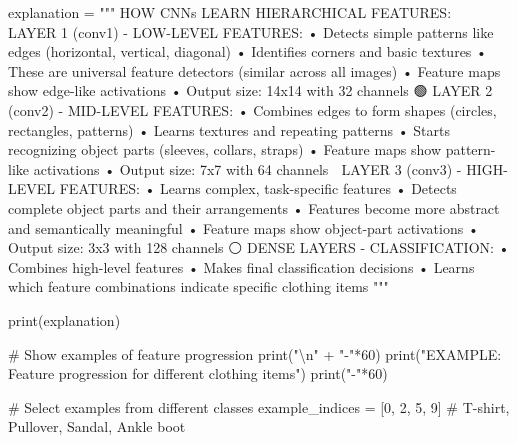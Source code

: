\documentclass[
  letterpaper,
  DIV=11,
  numbers=noendperiod]{scrreprt}
\newenvironment{Shaded}{\begin{snugshade}}{\end{snugshade}}
\newcommand{\BuiltInTok}[1]{\textcolor[rgb]{0.00,0.23,0.31}{#1}}
\newcommand{\CharTok}[1]{\textcolor[rgb]{0.13,0.47,0.30}{#1}}
\newcommand{\CommentTok}[1]{\textcolor[rgb]{0.37,0.37,0.37}{#1}}
\newcommand{\DecValTok}[1]{\textcolor[rgb]{0.68,0.00,0.00}{#1}}
\newcommand{\NormalTok}[1]{\textcolor[rgb]{0.00,0.23,0.31}{#1}}
\newcommand{\OperatorTok}[1]{\textcolor[rgb]{0.37,0.37,0.37}{#1}}
\newcommand{\StringTok}[1]{\textcolor[rgb]{0.13,0.47,0.30}{#1}}
\begin{document}
\begin{Shaded}
\begin{Highlighting}[]
\NormalTok{    explanation }\OperatorTok{=} \StringTok{"""}
\StringTok{    HOW CNNs LEARN HIERARCHICAL FEATURES:}
\StringTok{    }
\StringTok{    🔵 LAYER 1 (conv1) {-} LOW{-}LEVEL FEATURES:}
\StringTok{       • Detects simple patterns like edges (horizontal, vertical, diagonal)}
\StringTok{       • Identifies corners and basic textures}
\StringTok{       • These are universal feature detectors (similar across all images)}
\StringTok{       • Feature maps show edge{-}like activations}
\StringTok{       • Output size: 14x14 with 32 channels}
\StringTok{    }
\StringTok{    🟢 LAYER 2 (conv2) {-} MID{-}LEVEL FEATURES:}
\StringTok{       • Combines edges to form shapes (circles, rectangles, patterns)}
\StringTok{       • Learns textures and repeating patterns}
\StringTok{       • Starts recognizing object parts (sleeves, collars, straps)}
\StringTok{       • Feature maps show pattern{-}like activations}
\StringTok{       • Output size: 7x7 with 64 channels}
\StringTok{    }
\StringTok{    🔴 LAYER 3 (conv3) {-} HIGH{-}LEVEL FEATURES:}
\StringTok{       • Learns complex, task{-}specific features}
\StringTok{       • Detects complete object parts and their arrangements}
\StringTok{       • Features become more abstract and semantically meaningful}
\StringTok{       • Feature maps show object{-}part activations}
\StringTok{       • Output size: 3x3 with 128 channels}
\StringTok{    }
\StringTok{    ⚪ DENSE LAYERS {-} CLASSIFICATION:}
\StringTok{       • Combines high{-}level features}
\StringTok{       • Makes final classification decisions}
\StringTok{       • Learns which feature combinations indicate specific clothing items}
\StringTok{    """}
    
    \BuiltInTok{print}\NormalTok{(explanation)}
    
    \CommentTok{\# Show examples of feature progression}
    \BuiltInTok{print}\NormalTok{(}\StringTok{"}\CharTok{\textbackslash{}n}\StringTok{"} \OperatorTok{+} \StringTok{"{-}"}\OperatorTok{*}\DecValTok{60}\NormalTok{)}
    \BuiltInTok{print}\NormalTok{(}\StringTok{"EXAMPLE: Feature progression for different clothing items"}\NormalTok{)}
    \BuiltInTok{print}\NormalTok{(}\StringTok{"{-}"}\OperatorTok{*}\DecValTok{60}\NormalTok{)}
    
    \CommentTok{\# Select examples from different classes}
\NormalTok{    example\_indices }\OperatorTok{=}\NormalTok{ [}\DecValTok{0}\NormalTok{, }\DecValTok{2}\NormalTok{, }\DecValTok{5}\NormalTok{, }\DecValTok{9}\NormalTok{]  }\CommentTok{\# T{-}shirt, Pullover, Sandal, Ankle boot}
    

\end{Highlighting}
\end{Shaded}
\end{document}
